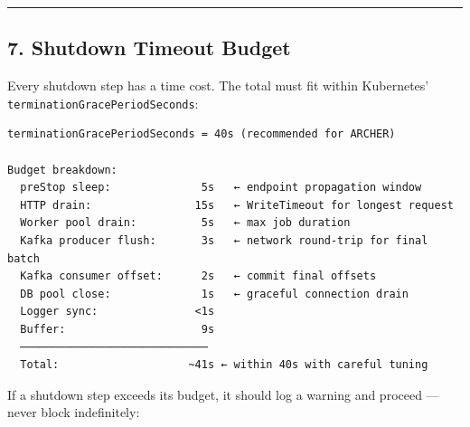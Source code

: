\documentclass[
]{article}
\begin{document}
\begin{center}\rule{0.5\linewidth}{0.5pt}\end{center}

\hypertarget{shutdown-timeout-budget}{%
\subsection{7. Shutdown Timeout Budget}\label{shutdown-timeout-budget}}

Every shutdown step has a time cost. The total must fit within
Kubernetes' \texttt{terminationGracePeriodSeconds}:

\begin{verbatim}
terminationGracePeriodSeconds = 40s (recommended for ARCHER)

Budget breakdown:
  preStop sleep:              5s   ← endpoint propagation window
  HTTP drain:                15s   ← WriteTimeout for longest request
  Worker pool drain:          5s   ← max job duration
  Kafka producer flush:       3s   ← network round-trip for final batch
  Kafka consumer offset:      2s   ← commit final offsets
  DB pool close:              1s   ← graceful connection drain
  Logger sync:               <1s
  Buffer:                     9s
  ─────────────────────────────
  Total:                    ~41s ← within 40s with careful tuning
\end{verbatim}

If a shutdown step exceeds its budget, it should log a warning and
proceed --- never block indefinitely:
\end{document}
